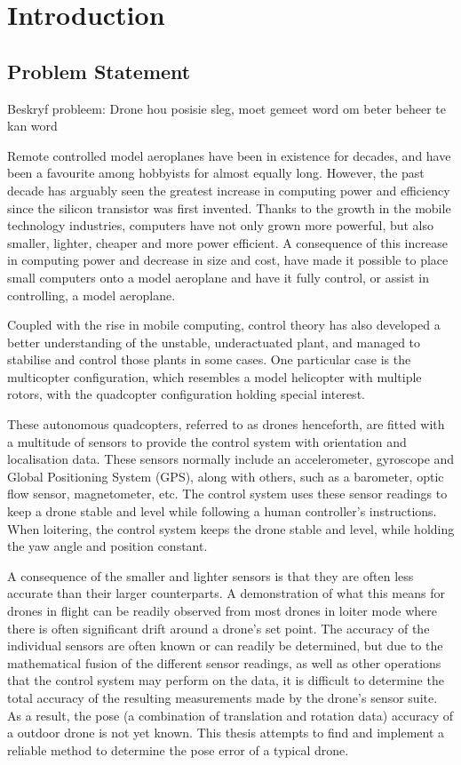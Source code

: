 \chapter{Introduction}

\section{Problem Statement}
\label{sec:problem-statement}

Beskryf probleem:
Drone hou posisie sleg, moet gemeet word om beter beheer te kan word

Remote controlled model aeroplanes have been in existence for decades, and have been a favourite among hobbyists for almost equally long. However, the past decade has arguably seen the greatest increase in computing power and efficiency since the silicon transistor was first invented. Thanks to the growth in the mobile technology industries, computers have not only grown more powerful, but also smaller, lighter, cheaper and more power efficient. A consequence of this increase in computing power and decrease in size and cost, have made it possible to place small computers onto a model aeroplane and have it fully control, or assist in controlling, a model aeroplane. 

Coupled with the rise in mobile computing, control theory has also developed a better understanding of the unstable, underactuated plant, and managed to stabilise and control those plants in some cases. One particular case is the multicopter configuration, which resembles a model helicopter with multiple rotors, with the quadcopter configuration holding special interest. 

These autonomous quadcopters, referred to as drones henceforth, are fitted with a multitude of sensors to provide the control system with orientation and localisation data. These sensors normally include an accelerometer, gyroscope and Global Positioning System (GPS), along with others, such as a barometer, optic flow sensor, magnetometer, etc. The control system uses these sensor readings to keep a drone stable and level while following a human controller's instructions. When loitering, the control system keeps the drone stable and level, while holding the yaw angle and position constant. 

A consequence of the smaller and lighter sensors is that they are often less accurate than their larger counterparts. A demonstration of what this means for drones in flight can be readily observed from most drones in loiter mode where there is often significant drift around a drone's set point. The accuracy of the individual sensors are often known or can readily be determined, but due to the mathematical fusion of the different sensor readings, as well as other operations that the control system may perform on the data, it is difficult to determine the total accuracy of the resulting measurements made by the drone's sensor suite. As a result, the pose (a combination of translation and rotation data) accuracy of a outdoor drone is not yet known. This thesis attempts to find and implement a reliable method to determine the pose error of a typical drone.  

